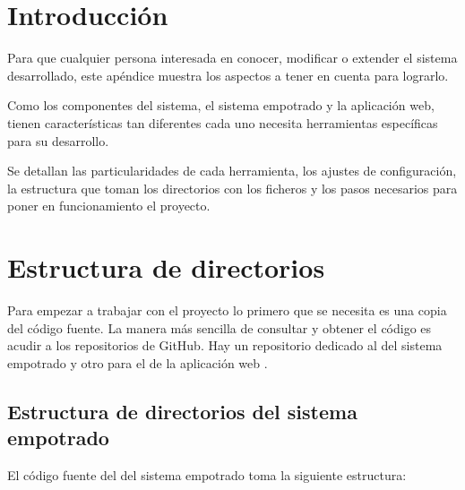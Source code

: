  \label{ch:man-dev}

\section{Introducción} \label{sec:man-dev-intro}
Para que cualquier persona interesada en conocer, modificar o extender
el sistema desarrollado, este apéndice muestra los aspectos a tener en cuenta
para lograrlo.

Como los componentes del sistema, el sistema empotrado y la aplicación web,
tienen características tan diferentes cada uno necesita herramientas específicas
para su desarrollo.

Se detallan las particularidades de cada herramienta, los ajustes de
configuración, la estructura que toman los directorios con los ficheros
y los pasos necesarios para poner en funcionamiento el proyecto.



\section{Estructura de directorios} \label{sec:man-dev-struct}
Para empezar a trabajar con el proyecto lo primero que se necesita es una
copia del código fuente. La manera más sencilla de consultar y obtener el código
es acudir a los repositorios de GitHub. Hay un repositorio dedicado al \sw{}
del sistema empotrado \cite{webpage:repo-se} y otro para el \sw{} de la
aplicación web \cite{webpage:repo-aw}.


\subsection{Estructura de directorios del sistema empotrado}
\label{sec:man-dev-struct-se}
El código fuente del \sw{} del sistema empotrado toma la siguiente estructura:

